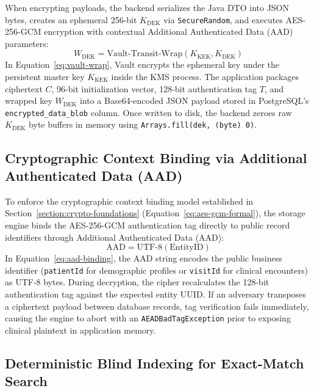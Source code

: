 When encrypting payloads, the backend serializes the Java DTO into JSON bytes, creates an ephemeral 256-bit $K_{\text{DEK}}$ via \texttt{SecureRandom}, and executes AES-256-GCM encryption with contextual Additional Authenticated Data (AAD) parameters:
\begin{equation}
    W_{\text{DEK}} = \text{Vault-Transit-Wrap}(K_{\text{KEK}}, K_{\text{DEK}})
    \label{eq:vault-wrap}
\end{equation}
In Equation~\ref{eq:vault-wrap}, Vault encrypts the ephemeral key under the persistent master key $K_{\text{KEK}}$ inside the KMS process. The application packages ciphertext $C$, 96-bit initialization vector, 128-bit authentication tag $T$, and wrapped key $W_{\text{DEK}}$ into a Base64-encoded JSON payload stored in PostgreSQL's \texttt{encrypted\_data\_blob} column. Once written to disk, the backend zeroes raw $K_{\text{DEK}}$ byte buffers in memory using \texttt{Arrays.fill(dek, (byte) 0)}.

\subsection{Cryptographic Context Binding via Additional Authenticated Data (AAD)}

To enforce the cryptographic context binding model established in Section~\ref{section:crypto-foundations} (Equation~\ref{eq:aes-gcm-formal}), the storage engine binds the AES-256-GCM authentication tag directly to public record identifiers through Additional Authenticated Data (AAD):
\begin{equation}
    \text{AAD} = \text{UTF-8}(\text{EntityID})
    \label{eq:aad-binding}
\end{equation}
In Equation~\ref{eq:aad-binding}, the $\text{AAD}$ string encodes the public business identifier (\texttt{patientId} for demographic profiles or \texttt{visitId} for clinical encounters) as UTF-8 bytes. During decryption, the cipher recalculates the 128-bit authentication tag against the expected entity UUID. If an adversary transposes a ciphertext payload between database records, tag verification fails immediately, causing the engine to abort with an \texttt{AEADBadTagException} prior to exposing clinical plaintext in application memory.

\subsection{Deterministic Blind Indexing for Exact-Match Search}

